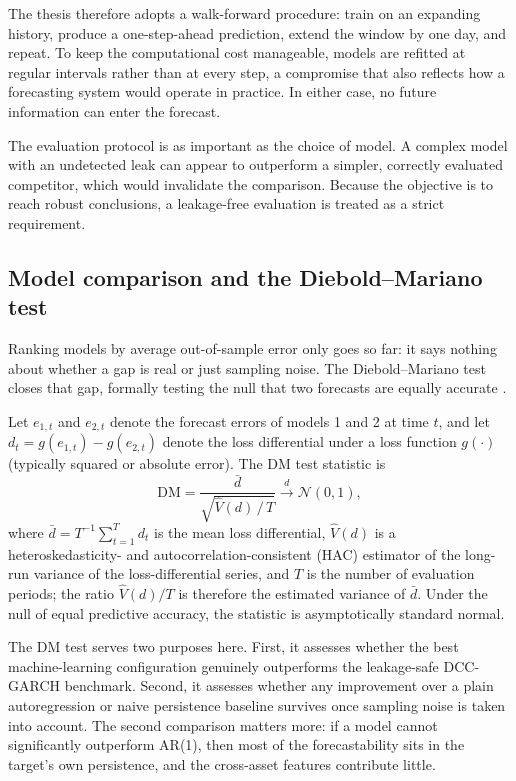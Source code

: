 The thesis therefore adopts a walk-forward procedure: train on an expanding history, produce a one-step-ahead prediction, extend the window by one day, and repeat. To keep the computational cost manageable, models are refitted at regular intervals rather than at every step, a compromise that also reflects how a forecasting system would operate in practice. In either case, no future information can enter the forecast.

The evaluation protocol is as important as the choice of model. A complex model with an undetected leak can appear to outperform a simpler, correctly evaluated competitor, which would invalidate the comparison. Because the objective is to reach robust conclusions, a leakage-free evaluation is treated as a strict requirement.

\subsection{Model comparison and the Diebold--Mariano test}

Ranking models by average out-of-sample error only goes so far: it says nothing about whether a gap is real or just sampling noise. The Diebold--Mariano test closes that gap, formally testing the null that two forecasts are equally accurate \cite{diebold1995}.

Let $e_{1,t}$ and $e_{2,t}$ denote the forecast errors of models 1 and 2 at time $t$, and let $d_t = g(e_{1,t}) - g(e_{2,t})$ denote the loss differential under a loss function $g(\cdot)$ (typically squared or absolute error). The DM test statistic is
\begin{equation}
    \mathrm{DM} = \frac{\bar{d}}{\sqrt{\hat{V}(d)\,/\, T}} \xrightarrow{d} \mathcal{N}(0,1),
\end{equation}
where $\bar{d} = T^{-1}\sum_{t=1}^{T} d_t$ is the mean loss differential, $\hat{V}(d)$ is a heteroskedasticity- and autocorrelation-consistent (HAC) estimator of the long-run variance of the loss-differential series, and $T$ is the number of evaluation periods; the ratio $\hat{V}(d)/T$ is therefore the estimated variance of $\bar{d}$. Under the null of equal predictive accuracy, the statistic is asymptotically standard normal.

The DM test serves two purposes here. First, it assesses whether the best machine-learning configuration genuinely outperforms the leakage-safe DCC-GARCH benchmark. Second, it assesses whether any improvement over a plain autoregression or naive persistence baseline survives once sampling noise is taken into account. The second comparison matters more: if a model cannot significantly outperform AR(1), then most of the forecastability sits in the target's own persistence, and the cross-asset features contribute little.

